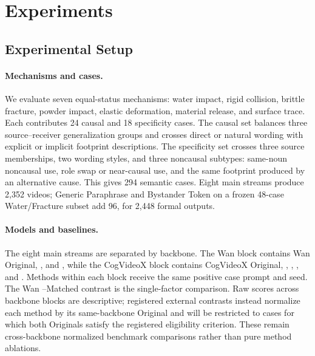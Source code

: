 \section{Experiments}
\label{sec:experiments}


\subsection{Experimental Setup}
\label{subsec:experimental-setup}

\paragraph{Mechanisms and cases.}
We evaluate seven equal-status mechanisms: water impact, rigid collision,
brittle fracture, powder impact, elastic deformation, material release, and
surface trace. Each contributes 24 causal and 18 specificity cases. The causal
set balances three source--receiver generalization groups and crosses direct
or natural wording with explicit or implicit footprint descriptions. The
specificity set crosses three source memberships, two wording styles, and
three noncausal subtypes: same-noun noncausal use, role swap or near-causal
use, and the
same footprint produced by an alternative cause. This gives 294 semantic
cases. Eight main streams produce 2,352 videos; Generic Paraphrase and
Bystander Token on a frozen 48-case Water/Fracture subset add 96, for 2,448
formal outputs.

\paragraph{Models and baselines.}
The eight main streams are separated by backbone. The Wan block contains Wan Original,
\matchedcontrol, and \methodshort, while the CogVideoX block contains
CogVideoX Original, \negativeprompt, \videoeraser, \tvtwounlearning, and
\safree. Methods within each block receive the same positive case prompt and
seed. The
Wan \methodshort{}--Matched contrast is the single-factor comparison. Raw
scores across backbone blocks are descriptive; registered external contrasts
instead normalize each method by its same-backbone Original and will be
restricted to cases for which both Originals satisfy the registered
eligibility criterion. These remain cross-backbone normalized benchmark
comparisons rather than pure method ablations.

